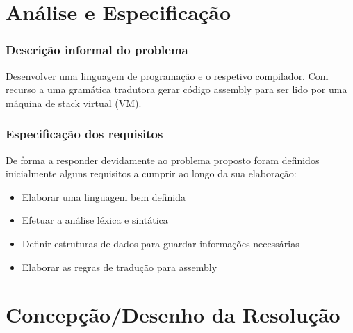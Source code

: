 \documentclass[11pt,a4paper]{report}
\begin{document}
\chapter{Análise e Especificação} \label{chap:analiseEspecificacao}		%


\subsection{Descrição informal do problema}

Desenvolver uma linguagem de programação e o respetivo compilador. Com recurso a uma gramática tradutora gerar código assembly para ser lido por uma máquina de stack virtual (VM).

\subsection{Especificação dos requisitos}

De forma a responder devidamente ao problema proposto foram definidos inicialmente alguns requisitos a cumprir ao longo da sua elaboração:

\begin{itemize}

\item{Elaborar uma linguagem bem definida}

\item{Efetuar a análise léxica e sintática}

\item{Definir estruturas de dados para guardar informações necessárias}

\item{Elaborar as regras de tradução para assembly}
	
\end{itemize}




\chapter{Concepção/Desenho da Resolução}			%
\end{document}

